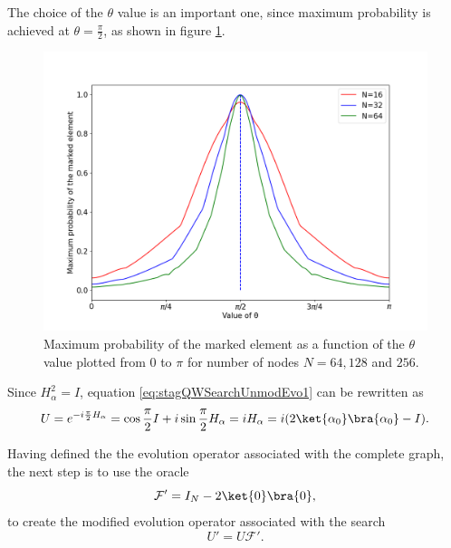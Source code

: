                The choice of the $\theta$ value is an important one, since maximum probability is achieved at $\theta = \frac{\pi}{2}$, as shown in figure \ref{fig:stagMultTheta}.
            \begin{figure}[!h]
                    \centering
                  \includegraphics[scale=0.40]{img/StagQuantumWalk/Search/Theta163264.png}
                     \caption{Maximum probability of the marked element as a function of the $\theta$ value plotted from $0$ to $\pi$ for number of nodes $N=64,128$ and $256$.} 
                     \label{fig:stagMultTheta}
              \end{figure}
              Since $H_\alpha^2 = I$, equation \ref{eq:stagQWSearchUnmodEvo1} can be rewritten as
              \begin{equation}
                  U = e^{-i\frac{\pi}{2} H_\alpha} = \cos{\frac{\pi}{2}I} + i\sin{\frac{\pi}{2}H_\alpha} = i H_\alpha = i(2\ket{\alpha_0}\bra{\alpha_0} - I).
              \end{equation}\par
               Having defined the the evolution operator associated with the complete graph, the next step is to use the oracle
                \begin{equation}
                    \mathcal{F'} = I_N - 2\ket{0}\bra{0},
                \end{equation}
                to create the modified evolution operator associated with the search
                \begin{equation}
                    U' = U\mathcal{F'}.
                \end{equation}\par
